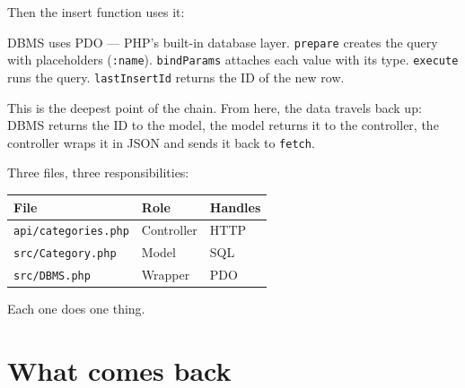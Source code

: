\documentclass[11pt,a4paper,oneside]{book}
\newenvironment{Shaded}{\begin{snugshade}}{\end{snugshade}}
\newcommand{\KeywordTok}[1]{\textcolor[HTML]{007020}{\textbf{#1}}}
\newcommand{\DataTypeTok}[1]{\textcolor[HTML]{902000}{#1}}
\newcommand{\OtherTok}[1]{\textcolor[HTML]{007020}{#1}}
\newcommand{\VariableTok}[1]{\textcolor[HTML]{19177C}{#1}}
\newcommand{\ControlFlowTok}[1]{\textcolor[HTML]{007020}{\textbf{#1}}}
\newcommand{\OperatorTok}[1]{\textcolor[HTML]{666666}{#1}}
\newcommand{\BuiltInTok}[1]{#1}
\newcommand{\NormalTok}[1]{#1}
\begin{document}
Then the insert function uses it:

\begin{Shaded}
\end{Shaded}

DBMS uses PDO --- PHP's built-in database layer. \texttt{prepare}
creates the query with placeholders (\texttt{:name}).
\texttt{bindParams} attaches each value with its type.
\texttt{execute} runs the query. \texttt{lastInsertId} returns
the ID of the new row.

This is the deepest point of the chain. From here, the data
travels back up: DBMS returns the ID to the model, the model
returns it to the controller, the controller wraps it in JSON and
sends it back to \texttt{fetch}.

Three files, three responsibilities:

\begin{longtable}[]{@{}lll@{}}
\toprule
File & Role & Handles \\
\midrule
\endhead
\texttt{api/categories.php} & Controller & HTTP \\
\texttt{src/Category.php} & Model & SQL \\
\texttt{src/DBMS.php} & Wrapper & PDO \\
\bottomrule
\end{longtable}

Each one does one thing.

\hypertarget{what-comes-back}{%
\section{What comes back}\label{what-comes-back}}
\end{document}
